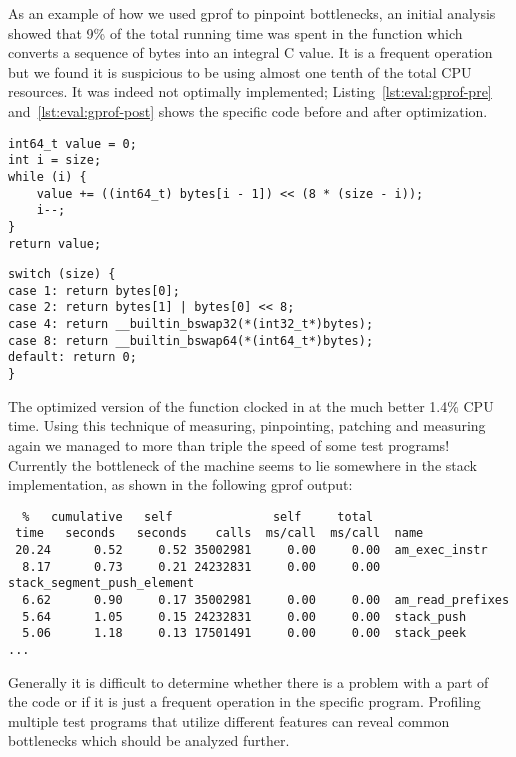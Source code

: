 As an example of how we used gprof to pinpoint bottlenecks, an initial analysis
showed that 9\% of the total running time was spent in the function
 which converts a sequence of bytes into an integral C value. It
is a frequent operation but we found it is suspicious to be using almost one
tenth of the total CPU resources. It was indeed not optimally
implemented; Listing~\ref{lst:eval:gprof-pre} and~\ref{lst:eval:gprof-post}
shows the specific code before and after optimization.

\begin{lstlisting}[language={[ANSI]C},%
  caption={The function \code{bytes2int} before optimization.},%
  label={lst:eval:gprof-pre}]
int64_t value = 0;
int i = size;
while (i) {
    value += ((int64_t) bytes[i - 1]) << (8 * (size - i));
    i--;
}
return value;
\end{lstlisting}

\begin{lstlisting}[language={[ANSI]C},%
  caption={The function \code{bytes2int} after optimization},%
  label={lst:eval:gprof-post}]
switch (size) {
case 1: return bytes[0];
case 2: return bytes[1] | bytes[0] << 8;
case 4: return __builtin_bswap32(*(int32_t*)bytes);
case 8: return __builtin_bswap64(*(int64_t*)bytes);
default: return 0;
}
\end{lstlisting}

The optimized version of the function clocked in at the much better 1.4\% CPU
time. Using this technique of measuring, pinpointing, patching and measuring
again we managed to more than triple the speed of some test programs! Currently
the bottleneck of the machine seems to lie somewhere in the stack
implementation, as shown in the following gprof output:

\begin{verbatim}
  %   cumulative   self              self     total
 time   seconds   seconds    calls  ms/call  ms/call  name
 20.24      0.52     0.52 35002981     0.00     0.00  am_exec_instr
  8.17      0.73     0.21 24232831     0.00     0.00  stack_segment_push_element
  6.62      0.90     0.17 35002981     0.00     0.00  am_read_prefixes
  5.64      1.05     0.15 24232831     0.00     0.00  stack_push
  5.06      1.18     0.13 17501491     0.00     0.00  stack_peek
...
\end{verbatim}

Generally it is difficult to determine whether there is a problem with a part of
the code or if it is just a frequent operation in the specific
program. Profiling multiple test programs that utilize different features can
reveal common bottlenecks which should be analyzed further.

